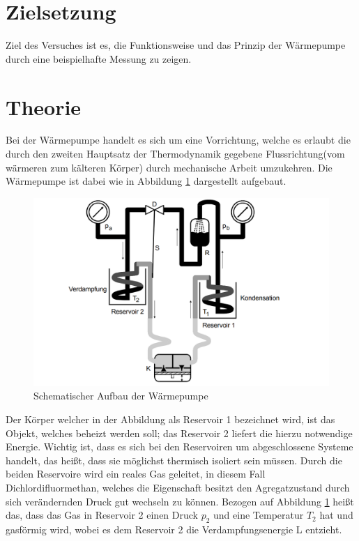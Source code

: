 \section{Zielsetzung}
  Ziel des Versuches ist es, die Funktionsweise und das Prinzip der Wärmepumpe durch eine beispielhafte Messung zu zeigen.

\section{Theorie}
  \label{sec:Theorie}
  Bei der Wärmepumpe handelt es sich um eine Vorrichtung, welche es erlaubt die durch den zweiten Hauptsatz der Thermodynamik gegebene Flussrichtung(vom wärmeren zum kälteren Körper) durch
  mechanische Arbeit umzukehren. Die Wärmepumpe ist dabei wie in Abbildung \ref{fig:skizze} dargestellt aufgebaut.
  \begin{figure}
    \centering
    \includegraphics[width=\textwidth]{content/skizze.png}
    \caption{Schematischer Aufbau der Wärmepumpe \cite[193]{206}}
    \label{fig:skizze}
  \end{figure}
  Der Körper welcher in der Abbildung als Reservoir 1 bezeichnet wird, ist das Objekt, welches beheizt werden soll; das Reservoir 2 liefert die hierzu notwendige Energie.
  Wichtig ist, dass es sich bei den Reservoiren um abgeschlossene Systeme handelt, das heißt, dass sie möglichst thermisch isoliert sein müssen.
  Durch die beiden Reservoire wird ein reales Gas geleitet, in diesem Fall Dichlordifluormethan, welches die Eigenschaft besitzt den Agregatzustand durch sich verändernden Druck gut wechseln zu können.
  Bezogen auf Abbildung \ref{fig:skizze} heißt das, dass das Gas in Reservoir 2 einen Druck $p_2$ und eine Temperatur $T_2$ hat und gasförmig wird, wobei es dem Reservoir 2 die Verdampfungsenergie L entzieht. 
